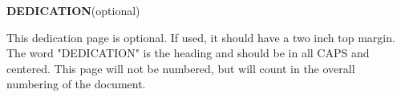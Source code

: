 \thispagestyle{empty}

\begin{center}
    \textbf{DEDICATION}(optional)
\end{center}

\smallskip

This dedication page is optional. If used, it should have a two inch top margin.
The word "DEDICATION" is the heading and should be in all CAPS and centered. This
page will not be numbered, but will count in the overall numbering of the document.
